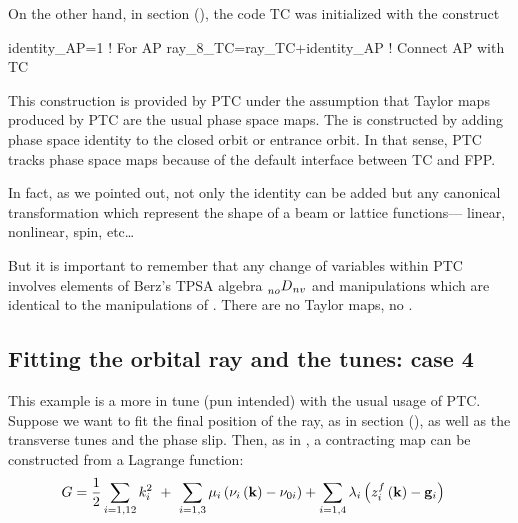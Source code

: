 \documentclass{hitec}     %
\begin{document}
{{{{{{  On the other hand, in section (), the code TC was initialized with the construct
  

\begin{code}
identity_AP=1  !  For AP
ray_8_TC=ray_TC+identity_AP   ! Connect AP with TC
\end{code}

This construction is provided by PTC under the assumption that Taylor maps produced by PTC are the usual phase space maps. The  is constructed by adding phase space identity to the closed orbit or entrance orbit. In that sense, PTC  tracks phase space maps because of the default interface between TC and FPP.

In fact, as we pointed out, not only the identity  can be added but any canonical transformation which represent the shape of a beam or lattice functions--- linear, nonlinear, spin, etc\ldots

But it is important to remember that any change of variables within PTC involves elements of Berz's TPSA algebra $\prescript{}{no}{D}_{nv}$ and manipulations which are identical to the manipulations of . There are no Taylor maps, no .

 \subsection{Fitting the orbital ray and the tunes: case 4}\label{s:lagmapt}
 
 
 This example is a more in tune (pun intended) with the usual usage of PTC. Suppose we want to fit the final position of the ray, as in section (), as well as the transverse tunes and the phase slip.  Then, as in , a contracting map can be constructed from a Lagrange function:
%
\begin{align} G&={1 \over 2}\sum\limits_{i=
1,12}^{} {k}_{i}^{2}\ +\ \sum\limits_{i=
1,3}^{} {\mu }_{i}\left({{\nu }_{i}\left({{\bf k}}\right) - {\nu }_{0i}}\right)+\sum\limits_{i=
1,4}^{} {\lambda }_{i}\left({{z}_{i}^{f}\left({{\bf k}}\right) - {{\bf g}}_{i}}\right) \label{eq:langt}\end{align}


}}}}}}
\end{document}
